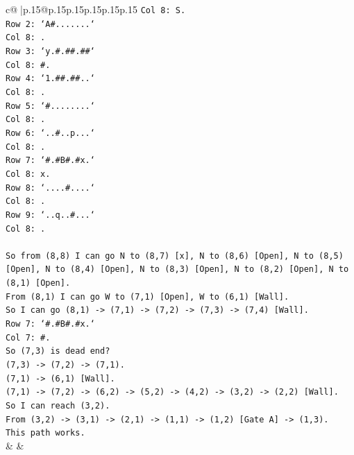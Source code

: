 \documentclass{article}
\begin{document}
{\begin{supertabular}{c@{$\;$}|p{.15\linewidth}@{}p{.15\linewidth}p{.15\linewidth}p{.15\linewidth}p{.15\linewidth}p{.15\linewidth}}
{{{\texttt{Col 8: S.} \\
\texttt{Row 2: `A\#.......`} \\
\texttt{Col 8: .} \\
\texttt{Row 3: `y.\#.\#\#.\#\#`} \\
\texttt{Col 8: \#.} \\
\texttt{Row 4: `1.\#\#.\#\#..`} \\
\texttt{Col 8: .} \\
\texttt{Row 5: `\#........`} \\
\texttt{Col 8: .} \\
\texttt{Row 6: `..\#..p...`} \\
\texttt{Col 8: .} \\
\texttt{Row 7: `\#.\#B\#.\#x.`} \\
\texttt{Col 8: x.} \\
\texttt{Row 8: `....\#....`} \\
\texttt{Col 8: .} \\
\texttt{Row 9: `..q..\#...`} \\
\texttt{Col 8: .} \\
\\ 
\texttt{So from (8,8) I can go N to (8,7) {[}x{]}, N to (8,6) {[}Open{]}, N to (8,5) {[}Open{]}, N to (8,4) {[}Open{]}, N to (8,3) {[}Open{]}, N to (8,2) {[}Open{]}, N to (8,1) {[}Open{]}.} \\
\texttt{From (8,1) I can go W to (7,1) {[}Open{]}, W to (6,1) {[}Wall{]}.} \\
\texttt{So I can go (8,1) {-}> (7,1) {-}> (7,2) {-}> (7,3) {-}> (7,4) {[}Wall{]}.} \\
\texttt{Row 7: `\#.\#B\#.\#x.`} \\
\texttt{Col 7: \#.} \\
\texttt{So (7,3) is dead end?} \\
\texttt{(7,3) {-}> (7,2) {-}> (7,1).} \\
\texttt{(7,1) {-}> (6,1) {[}Wall{]}.} \\
\texttt{(7,1) {-}> (7,2) {-}> (6,2) {-}> (5,2) {-}> (4,2) {-}> (3,2) {-}> (2,2) {[}Wall{]}.} \\
\texttt{So I can reach (3,2).} \\
\texttt{From (3,2) {-}> (3,1) {-}> (2,1) {-}> (1,1) {-}> (1,2) {[}Gate A{]} {-}> (1,3).} \\
\texttt{This path works.} \\
            }
        }
    }
    & & \\ \\


\end{supertabular}}
\end{document}
